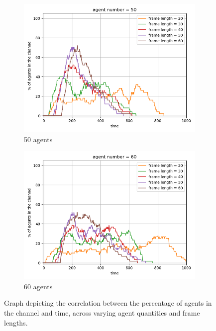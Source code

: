 \begin{figure}[htbp]
    \vspace{1cm}
    
    \begin{subfigure}[t]{0.45\linewidth}
        \centering
        \includegraphics[width=\linewidth]{figures/channel_usage_agent50.png}
        \caption{50 agents}
        \label{fig:agentpercent5}
    \end{subfigure}
    \hfill
    \begin{subfigure}[t]{0.45\linewidth}
        \centering
        \includegraphics[width=\linewidth]{figures/channel_usage_agent60.png}
        \caption{60 agents}
        \label{fig:agentpercent6}
    \end{subfigure}
    
    \caption{Graph depicting the correlation between the percentage of agents in the channel and time, across varying agent quantities and frame lengths.}
    \label{fig:agentpercent}
\end{figure}

